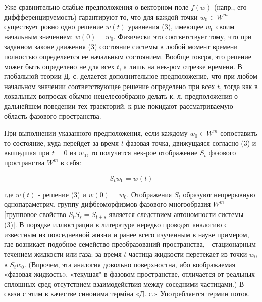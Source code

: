 \documentclass[10pt]{article}
\begin{document}
Уже сравнительно слабые предположения о векторном поле $f(w)$ (напр., его диффференцируемость) гарантируют то, что для каждой точки $w_{0} \in W^{m}$ существует ровно одно решение $w(t)$ уравнения (3), имеющее $w_{0}$ своим начальным значением: $w(0)=w_{0}$. Физически это соответствует тому, что при заданном законе движения (3) состояние системы в любой момент времени полностью определяется ее начальным состоянием. Вообще говсря, это репение может быть определено не для всех $t$, а лишь на нек-ром отрезке времени. В глобальной теории Д. с. делается дополнительное предположение, что при любом начальном значении соответствующее решение определено при всех $t$, тогда как в локальных вопросах обычно нецелесообразно делать к.-л. предположения о дальнейшем поведении тех траекторий, к-рые покидают рассматриваемую область фазового пространства.



При выполнении указанного предположения, если каждому $w_{0} \in W^{m}$ сопоставить то состояние, куда перейдет за время $t$ фазовая точка, движущаяся согласно (3) и вышедшая при $t=0$ из $w_{0}$, то получится нек-рое отображение $S_{t}$ фазового пространства $W^{m}$ в себя:



\[

S_{t} w_{0}=w(t)

\]



где $w(t)$ - решение (3) и $w(0)=w_{0}$. Отображения $S_{t}$ образуют непрерывную однопараметрич. группу дифбеоморфизмов фазового многообразия $W^{m}$ [групповое свойство $S_{t} S_{s}=S_{t+s}$ является следствием автономности системы (3)]. В порядке иллюстрации в литературе нередко проводят аналогию с известным из повседневной жизни и ранее всего изученным в науке примером, где возникает подобное семейство преобразований пространства, - стационарным течением жидкости или газа: за время $t$ частица жидкости перетекает из точки $w_{0}$ в $S_{t} w_{0}$. (Впрочем, эта аналогия довольно поверхностна, ибо воображаемая «фазовая жидкость», «текущая" в фазовом пространстве, отличается от реальных сплошных сред отсутствием взаимодействия между соседними частицами.) В связи с этим в качестве синонима терміна «Д. с.» Употребляется термин поток.
\end{document}
